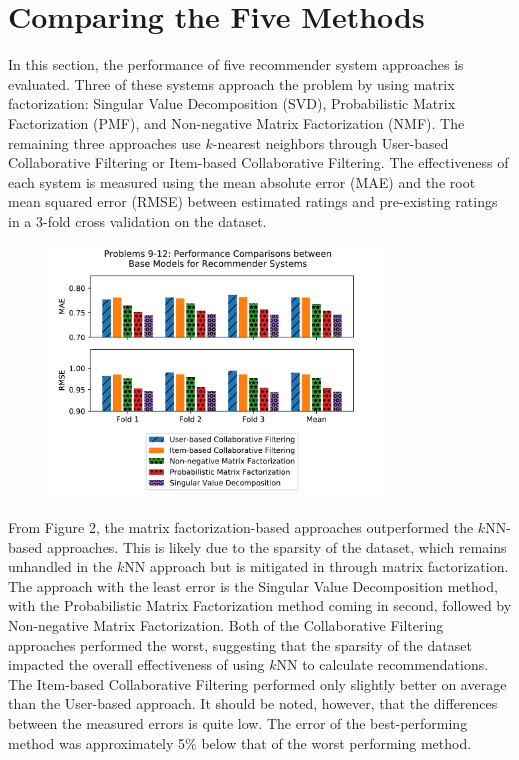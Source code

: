\documentclass[11pt]{article}
\begin{document}
\section{Comparing the Five Methods} \label{sec:experiments}

In this section, the performance of five recommender system approaches is evaluated.
Three of these systems approach the problem by using matrix factorization: Singular Value Decomposition (SVD), Probabilistic Matrix Factorization (PMF), and Non-negative Matrix Factorization (NMF).
The remaining three approaches use $k$-nearest neighbors through User-based Collaborative Filtering or Item-based Collaborative Filtering.
The effectiveness of each system is measured using the mean absolute error (MAE) and the root mean squared error (RMSE) between estimated ratings and pre-existing ratings in a 3-fold cross validation on the dataset.


\begin{figure}[h!] \label{fig:threefoldcross}
  \centering
  \includegraphics[width=0.8\textwidth]{rmse_mae_comp}
  \caption{}
\end{figure}

From Figure 2, the matrix factorization-based approaches outperformed the $k$NN-based approaches.
This is likely due to the sparsity of the dataset, which remains unhandled in the $k$NN approach but is mitigated in through matrix factorization.
The approach with the least error is the Singular Value Decomposition method, with the Probabilistic Matrix Factorization method coming in second, followed by Non-negative Matrix Factorization.
Both of the Collaborative Filtering approaches performed the worst, suggesting that the sparsity of the dataset impacted the overall effectiveness of using $k$NN to calculate recommendations.
The Item-based Collaborative Filtering performed only slightly better on average than the User-based approach.
It should be noted, however, that the differences between the measured errors is quite low.
The error of the best-performing method was approximately 5\% below that of the worst performing method.
\end{document}
